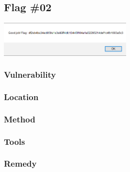 \subsection{Flag \#02}

\begin{center}
    \includegraphics[width=0.5\textwidth]{3.cookies/01-03.png}\\[0cm] 
\end{center}

\subsubsection{Vulnerability}

\subsubsection{Location}

\subsubsection{Method}

\subsubsection{Tools}

\subsubsection{Remedy}